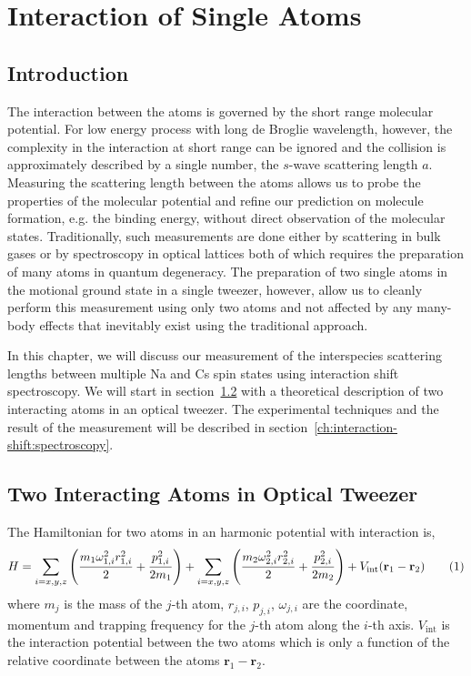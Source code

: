 
\chapter{Interaction of Single Atoms}
\label{ch:interaction-shift}

\section{Introduction}
\label{ch:interaction-shift:introduction}

The interaction between the atoms is governed by the short range molecular potential.
For low energy process with long de Broglie wavelength, however,
the complexity in the interaction at short range
can be ignored and the collision is approximately described by a single number,
the $s$-wave scattering length $a$.
Measuring the scattering length between the atoms allows us to probe the properties
of the molecular potential and refine our prediction on molecule formation,
e.g. the binding energy, without direct observation of the molecular states.
Traditionally, such measurements are done either by scattering in bulk gases
or by spectroscopy in optical lattices both of which requires the preparation
of many atoms in quantum degeneracy.
The preparation of two single atoms in the motional ground state in a single tweezer,
however, allow us to cleanly perform this measurement using only two atoms
and not affected by any many-body effects that inevitably exist using the traditional approach.

In this chapter, we will discuss our measurement of the interspecies scattering lengths
between multiple Na and Cs spin states using interaction shift spectroscopy.
We will start in section~\ref{ch:interaction-shift:theory}
with a theoretical description of two interacting atoms in an optical tweezer.
The experimental techniques and the result of the measurement will be described
in section~\ref{ch:interaction-shift:spectroscopy}.

\section{Two Interacting Atoms in Optical Tweezer}
\label{ch:interaction-shift:theory}

The Hamiltonian for two atoms in an harmonic potential with interaction is,
\[
  H=\sum_{i=x,y,z}\paren{\frac{m_{1}\omega_{1,i}^2r_{1,i}^2}{2}+\frac{p_{1,i}^2}{2m_{1}}}+\sum_{i=x,y,z}\paren{\frac{m_{2}\omega_{2,i}^2r_{2,i}^2}{2}+\frac{p_{2,i}^2}{2m_{2}}}+V_{\mathrm{int}}\paren{\mathbf{r}_1-\mathbf{r}_2}\numberthis{eq:interaction-shift:orig-hamiltonian}
\]
where $m_j$ is the mass of the $j$-th atom,
$r_{j,i}$, $p_{j,i}$, $\omega_{j,i}$ are the coordinate, momentum and trapping frequency
for the $j$-th atom along the $i$-th axis.
$V_{\mathrm{int}}$ is the interaction potential between the two atoms which is only a function
of the relative coordinate between the atoms $\mathbf{r}_1-\mathbf{r}_2$.

